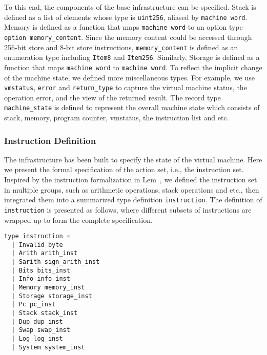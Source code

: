 \documentclass[runningheads]{llncs}
\begin{document}
To this end, the components of the base infrastructure can be specified. Stack is defined as a list of elements whose type is \texttt{uint256}, aliased by \texttt{machine word}. Memory is defined as a function that maps \texttt{machine word} to an option type \texttt{option memory\_content}. Since the memory content could be accessed through 256-bit store and 8-bit store instructions, \texttt{memory\_content} is defined as an enumeration type including \texttt{Item8} and \texttt{Item256}. Similarly, Storage is defined as a function that maps \texttt{machine word} to \texttt{machine word}. To reflect the implicit change of the machine state, we defined more miscellaneous types. For example, we use \texttt{vmstatus}, \texttt{error} and \texttt{return\_type} to capture the virtual machine status, the operation error, and the view of the returned result. The record type \texttt{machine\_state} is defined to represent the overall machine state which consists of stack, memory, program counter, vmstatus, the instruction list and etc.

\subsubsection{Instruction Definition}\label{sec:instruction}
The infrastructure has been built to specify the state of the virtual machine. Here we present the formal specification of the action set, i.e., the instruction set. Inspired by the instruction formalization in Lem~\cite{hirai2017defining}, we defined the instruction set in multiple groups, such as arithmetic operations, stack operations and etc., then integrated them into a summarized type definition \texttt{instruction}. The definition of \texttt{instruction} is presented as follows, where different subsets of instructions are wrapped up to form the complete specification.
\begin{verbatim}
type instruction =
  | Invalid byte
  | Arith arith_inst  
  | Sarith sign_arith_inst
  | Bits bits_inst
  | Info info_inst
  | Memory memory_inst
  | Storage storage_inst
  | Pc pc_inst
  | Stack stack_inst
  | Dup dup_inst
  | Swap swap_inst
  | Log log_inst
  | System system_inst
\end{verbatim}
\end{document}

